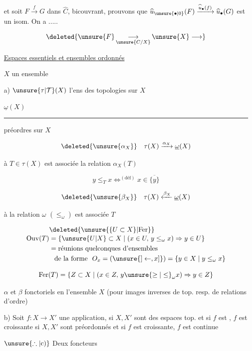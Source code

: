et soit $F\xrightarrow{f}G$ dans $\widehat C$, bicouvrant, prouvons que
$\widehat u_{\unsure{\bullet|0}}(F)\xrightarrow{\widehat u_{\bullet}(f)}\widehat u_{\bullet}(G)$ est  un isom. On a .....

\[
\deleted{\unsure{F}\mathop{\longrightarrow}_{\unsure{C/X}} \unsure{X}\longrightarrow}
\]

\uline{Espaces essentiels et ensembles ordonnés}

$X$ un ensemble

a) $\unsure{\tau|\mathcal T}(X)$ l'ens des topologies sur $X$

$\underline\omega(X)$ \rule{2.6em}{0.35pt} préordres sur $X$

\[
\deleted{\unsure{\alpha_X}}\quad \tau(X)\xrightarrow{\alpha_X}\underline\omega(X)
\]

à $T\in\tau(X)$ est associée la relation $\alpha_X(T)$

\[
y\leq_T x\mathrel{\mathop{\Longleftrightarrow}^{(\text{déf})}}x\in\overline{\{y\}}
\]

\[
\deleted{\unsure{\beta_X}}\quad\tau(X)\xleftarrow{\beta_X}\underline\omega(X)
\]

à la relation $\omega$ $({\leq}_{\omega})$ est associée $T$

\[
\begin{aligned}
&\deleted{\unsure{\{U\subset X\}|\mathrm{Fer}}}\\[-2pt]
\mathrm{Ouv}(T)&=\{\unsure{U|X}\subset X\mid(x\in U,\,y\leq_{\omega}x)\Rightarrow y\in U\}\\
&=\text{réunions quelconques d'ensembles}\\
&\phantom{=}\text{de la forme }\ O_x=(\unsure{]\leftarrow,x]})=\{y\in X\mid y\leq_{\omega} x\}
\end{aligned}
\]

\[
\mathrm{Fer}(T)=\{Z\subset X\mid(x\in Z,\,y\unsure{\geq|\leq}_{\omega}x)\Rightarrow y\in Z\}
\]

$\alpha$ et $\beta$ fonctoriels en l'ensemble $X$
(pour images inverses de top. resp. de relations d'ordre)

b) Soit $f:X\longrightarrow X'$ une application, 
si $X,X'$ sont des espaces top. et si $f$ est , $f$ est croissante
si $X,X'$ sont préordonnés et si $f$ est croissante, $f$ est continue

$\unsure{\therefore|\text{c)}}$ Deux foncteurs

